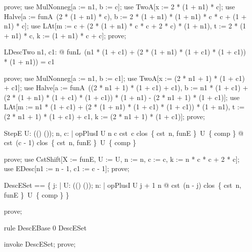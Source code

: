 \documentclass{article}
\begin{document}
\begin{zproof}
prove;
use MulNonneg[a := n1, b := c];
use TwoA[x := 2 * (1 + n1) * c];
use Halve[a := funA~(2 * (1 + n1) * c), b := 2 * (1 + n1) * (1 + n1) * c * c + (1 + n1) * c];
use LAt[m := c + (2 * (1 + n1) * c * c + 2 * c) * (1 + n1), t := 2 * (1 + n1) * c, k := (1 + n1) * c + c];
prove;
\end{zproof}

\begin{theorem}{LDescTwo}
  \forall n1, c1: \nat @ funL~(n1 * (1 + c1) + (2 * (1 + n1) * (1 + c1) * (1 + c1)) * (1 + n1)) = c1
\end{theorem}

\begin{zproof}
prove;
use MulNonneg[a := n1, b := c1];
use TwoA[x := (2 * n1 + 1) * (1 + c1) + c1];
use Halve[a := funA~((2 * n1 + 1) * (1 + c1) + c1), b := n1 * (1 + c1) + (2 * (1 + n1) * (1 + c1) * (1 + c1)) * (1 + n1) - (2 * n1 + 1) * (1 + c1)];
use LAt[m := n1 * (1 + c1) + (2 * (1 + n1) * (1 + c1) * (1 + c1)) * (1 + n1), t := (2 * n1 + 1) * (1 + c1) + c1, k := (2 * n1 + 1) * (1 + c1)];
prove;
\end{zproof}


\begin{theorem}{StepE}
  \forall U: \power ((\nat \fun \nat) \fun (\nat \fun \nat)); n, c: \nat | opPlusI \in U  \leq n  \leq c \land cst~c \in clos~\{ cst~n, funE \}~U~\{ comp \} @ cst~(c - 1) \in clos~\{ cst~n, funE \}~U~\{ comp \}
\end{theorem}

\begin{zproof}
prove;
use CstShift[X := funE, U := U, n := n, c := c, k := n * c * c + 2 * c];
use EDesc[n1 := n - 1, c1 := c - 1];
prove;
\end{zproof}

\begin{zed}
  DescESet == \{ j: \nat | \forall U: \power ((\nat \fun \nat) \fun (\nat \fun \nat)); n: \nat | opPlusI \in U \land j + 1 \leq n @ cst~(n - j) \in clos~\{ cst~n, funE \}~U~\{ comp \} \}
\end{zed}

\begin{zproof}
prove;
\end{zproof}

\begin{theorem}{rule DescEBase}
  0 \in DescESet
\end{theorem}

\begin{zproof}
invoke DescESet;
prove;
\end{zproof}
\end{document}

